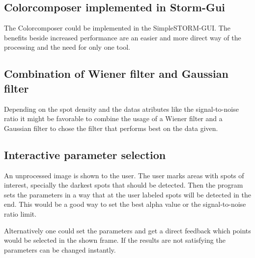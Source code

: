 \subsection*{Colorcomposer implemented in Storm-Gui}
The Colorcomposer could be implemented in the SimpleSTORM-GUI. The benefits beside increased performance are an easier and more direct way of the processing and the need for only one tool.
\subsection*{Combination of Wiener filter and Gaussian filter}
Depending on the spot density and the datas atributes like the signal-to-noise ratio it might be favorable to combine the usage of a Wiener filter and a Gaussian filter to chose the filter that performs best on the data given.
\subsection*{Interactive parameter selection}
An unprocessed image is shown to the user. The user marks areas with spots of interest, specially the darkest spots that should be detected. Then the program sets the parameters in a way that at the user labeled spots will be detected in the end. This would be a good way to set the best alpha value or the signal-to-noise ratio limit.\newline

Alternatively one could set the parameters and get a direct feedback which points would be selected in the shown frame. If the results are not satisfying the parameters can be changed instantly.